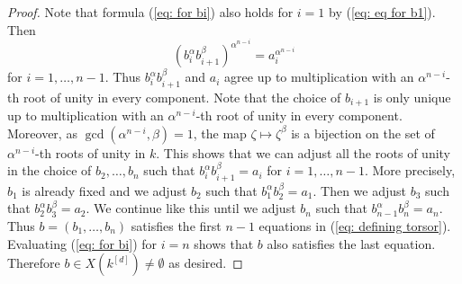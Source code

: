 \documentclass[oneside,reqno]{amsart}
\theoremstyle{definition}
\begin{document}
\begin{proof}
	Note that formula (\ref{eq: for bi}) also holds for $i=1$ by (\ref{eq: eq for b1}).
	Then 
	$$(b_i^\alpha b_{i+1}^\beta)^{\alpha^{n-i}}=a_i^{\alpha^{n-i}}$$
	for $i=1,\ldots,n-1$. Thus $b_i^\alpha b_{i+1}^\beta$ and $a_i$ agree up to multiplication with an $\alpha^{n-i}$-th root of unity in every component. Note that the choice of $b_{i+1}$ is only unique up to multiplication with an $\alpha^{n-i}$-th root of unity in every component. Moreover, as $\gcd(\alpha^{n-i},\beta)=1$, the map $\zeta\mapsto \zeta^\beta$ is a bijection on the set of $\alpha^{n-i}$-th roots of unity in $k$. This shows that we can adjust all the roots of unity in the choice of $b_2,\ldots,b_n$ such that $b_i^\alpha b_{i+1}^\beta=a_i$ for $i=1,\ldots,n-1$. More precisely, $b_1$ is already fixed and we adjust $b_2$ such that $b_1^\alpha b_2^\beta=a_1$. Then we adjust $b_3$ such that $b_2^\alpha b_3^\beta=a_2$. We continue like this until we adjust $b_n$ such that $b_{n-1}^\alpha b_n^\beta=a_n$. Thus $b=(b_1,\ldots,b_n)$ satisfies the first $n-1$ equations in (\ref{eq: defining torsor}). Evaluating (\ref{eq: for bi}) for $i=n$ shows that $b$ also satisfies the last equation. Therefore $b\in X(k^{[d]})\neq\emptyset$ as desired.
\end{proof}
\end{document}
